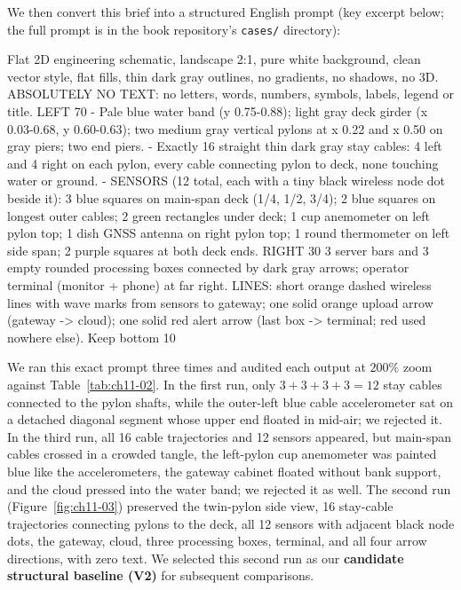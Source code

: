 We then convert this brief into a structured English prompt (key excerpt below; the full prompt is in the book repository's \texttt{cases/} directory):

\begin{Prompt}
Flat 2D engineering schematic, landscape 2:1, pure white background, clean vector
style, flat fills, thin dark gray outlines, no gradients, no shadows, no 3D.
ABSOLUTELY NO TEXT: no letters, words, numbers, symbols, labels, legend or title.
LEFT 70%
- Pale blue water band (y 0.75-0.88); light gray deck girder (x 0.03-0.68, y 0.60-0.63);
  two medium gray vertical pylons at x 0.22 and x 0.50 on gray piers; two end piers.
- Exactly 16 straight thin dark gray stay cables: 4 left and 4 right on each pylon,
  every cable connecting pylon to deck, none touching water or ground.
- SENSORS (12 total, each with a tiny black wireless node dot beside it):
  3 blue squares on main-span deck (1/4, 1/2, 3/4); 2 blue squares on longest outer
  cables; 2 green rectangles under deck; 1 cup anemometer on left pylon top; 1 dish
  GNSS antenna on right pylon top; 1 round thermometer on left side span; 2 purple
  squares at both deck ends.
RIGHT 30%
3 server bars and 3 empty rounded processing boxes connected by dark gray arrows;
operator terminal (monitor + phone) at far right.
LINES: short orange dashed wireless lines with wave marks from sensors to gateway;
one solid orange upload arrow (gateway -> cloud); one solid red alert arrow (last box
-> terminal; red used nowhere else). Keep bottom 10%
\end{Prompt}

We ran this exact prompt three times and audited each output at $200\%$ zoom against Table~\ref{tab:ch11-02}. In the first run, only $3+3+3+3=12$ stay cables connected to the pylon shafts, while the outer-left blue cable accelerometer sat on a detached diagonal segment whose upper end floated in mid-air; we rejected it. In the third run, all 16 cable trajectories and 12 sensors appeared, but main-span cables crossed in a crowded tangle, the left-pylon cup anemometer was painted blue like the accelerometers, the gateway cabinet floated without bank support, and the cloud pressed into the water band; we rejected it as well. The second run (Figure~\ref{fig:ch11-03}) preserved the twin-pylon side view, 16 stay-cable trajectories connecting pylons to the deck, all 12 sensors with adjacent black node dots, the gateway, cloud, three processing boxes, terminal, and all four arrow directions, with zero text. We selected this second run as our \textbf{candidate structural baseline (V2)} for subsequent comparisons.

